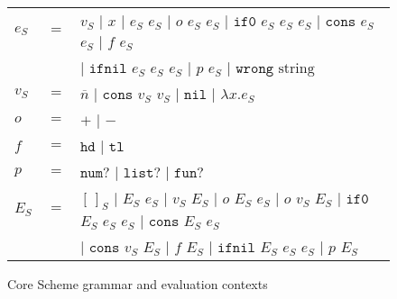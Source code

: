 \begin{figure}[p]
\centering
\begin{tabular}{lcl}
$e_{S}$ & $=$ & $v_{S}$ $\vert$ $x$ $\vert$ $e_{S}$ $e_{S}$ $\vert$ $o$ $e_{S}$ $e_{S}$ $\vert$ $\mathtt{if0}$ $e_{S}$ $e_{S}$ $e_{S}$ $\vert$ $\mathtt{cons}$ $e_{S}$ $e_{S}$ $\vert$ $f$ $e_{S}$ \\

\vspace{5pt}

&& $\vert$ $\mathtt{ifnil}$ $e_{S}$ $e_{S}$ $e_{S}$ $\vert$ $p$ $e_{S}$ $\vert$ $\mathtt{wrong}$ $\mathrm{string}$ \\

\vspace{5pt}

$v_{S}$ & $=$ & $\overline{n}$ $\vert$ $\mathtt{cons}$ $v_{S}$ $v_{S}$ $\vert$ $\mathtt{nil}$ $\vert$ $\lambda x.e_{S}$ \\

\vspace{5pt}

$o$ & $=$ & $\mathtt{+}$ $\vert$ $\mathtt{-}$ \\

\vspace{5pt}

$f$ & $=$ & $\mathtt{hd}$ $\vert$ $\mathtt{tl}$ \\

\vspace{5pt}

$p$ & $=$ & $\mathtt{num?}$ $\vert$ $\mathtt{list?}$ $\vert$ $\mathtt{fun?}$ \\

\vspace{5pt}

$E_{S}$ & $=$ & $[\,]_{S}$ $\vert$ $E_{S}$ $e_{S}$ $\vert$ $v_{S}$ $E_{S}$ $\vert$ $o$ $E_{S}$ $e_{S}$ $\vert$ $o$ $v_{S}$ $E_{S}$ $\vert$ $\mathtt{if0}$ $E_{S}$ $e_{S}$ $e_{S}$ $\vert$ $\mathtt{cons}$ $E_{S}$ $e_{S}$ \\

\vspace{5pt}

&& $\vert$ $\mathtt{cons}$ $v_{S}$ $E_{S}$ $\vert$ $f$ $E_{S}$ $\vert$ $\mathtt{ifnil}$ $E_{S}$ $e_{S}$ $e_{S}$ $\vert$ $p$ $E_{S}$
\end{tabular}
\caption{Core Scheme grammar and evaluation contexts}
\label{csg}
\end{figure}